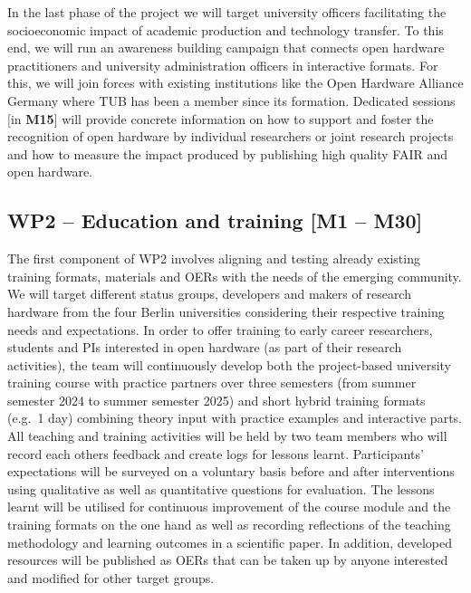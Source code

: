 \documentclass[
  12pt,
  a4paper,
]{article}
\begin{document}
In the last phase of the project we will target university officers
facilitating the socioeconomic impact of academic production and
technology transfer. To this end, we will run an awareness building
campaign that connects open hardware practitioners and university
administration officers in interactive formats. For this, we will join
forces with existing institutions like the Open Hardware Alliance
Germany where TUB has been a member since its formation. Dedicated
sessions {[}in \textbf{M15}{]} will provide concrete information on how
to support and foster the recognition of open hardware by individual
researchers or joint research projects and how to measure the impact
produced by publishing high quality FAIR and open hardware.

\hypertarget{wp2-education-and-training-m1-m30}{%
\subsection{WP2 -- Education and training {[}M1 --
M30{]}}\label{wp2-education-and-training-m1-m30}}

The first component of WP2 involves aligning and testing already
existing training formats, materials and OERs with the needs of the
emerging community. We will target different status groups, developers
and makers of research hardware from the four Berlin universities
considering their respective training needs and expectations. In order
to offer training to early career researchers, students and PIs
interested in open hardware (as part of their research activities), the
team will continuously develop both the project-based university
training course with practice partners over three semesters (from summer
semester 2024 to summer semester 2025) and short hybrid training formats
(e.g.~1 day) combining theory input with practice examples and
interactive parts. All teaching and training activities will be held by
two team members who will record each others feedback and create logs
for lessons learnt. Participants' expectations will be surveyed on a
voluntary basis before and after interventions using qualitative as well
as quantitative questions for evaluation. The lessons learnt will be
utilised for continuous improvement of the course module and the
training formats on the one hand as well as recording reflections of the
teaching methodology and learning outcomes in a scientific paper. In
addition, developed resources will be published as OERs that can be
taken up by anyone interested and modified for other target groups.
\end{document}
